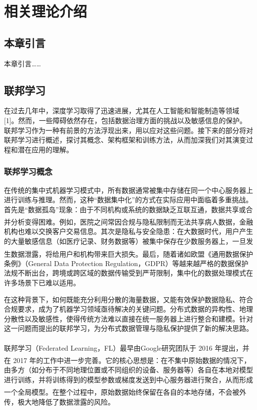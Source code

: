 


\chapter{相关理论介绍}
\thispagestyle{others}
\pagestyle{others}
\xiaosi

\section{本章引言}

本章引言……

\section{联邦学习}
在过去几年中，深度学习取得了迅速进展，尤其在人工智能和智能制造等领域[1]。然而，一些障碍依然存在，包括数据治理方面的挑战以及敏感信息的保护。联邦学习作为一种有前景的方法浮现出来，用以应对这些问题。接下来的部分将对联邦学习进行概述，探讨其概念、架构框架和训练方法，从而加深我们对其演变过程和潜在应用的理解。
\subsection{联邦学习概念}
在传统的集中式机器学习模式中，所有数据通常被集中存储在同一个中心服务器上进行训练与推理。然而，这种“数据集中化”的方式在实际应用中面临着多重挑战。首先是“数据孤岛”现象：由于不同机构或系统的数据缺乏互联互通，数据共享或合并分析变得困难\textsuperscript{\textsuperscript{\cite{yang2019federated}}}。例如，医院之间常因合规与隐私限制而无法共享病人数据，金融机构也难以交换客户交易信息。其次是隐私与安全隐患：在大数据时代，用户产生的大量敏感信息（如医疗记录、财务数据等）被集中保存在少数服务器上，一旦发生数据泄露，将给用户和机构带来巨大损失\textsuperscript{\textsuperscript{\cite{mcmahan2017communication}}}。最后，随着诸如欧盟《通用数据保护条例》（General Data Protection Regulation，GDPR）等越来越严格的数据保护法规不断出台，跨境或跨区域的数据传输受到严苛限制，集中化的数据处理模式在许多场景下已难以适用。

在这种背景下，如何既能充分利用分散的海量数据，又能有效保护数据隐私、符合合规要求，成为了机器学习领域亟待解决的关键问题。分布式数据的异构性、地理分散性以及敏感性，使得传统方法难以直接在统一服务器上进行整合和建模。针对这一问题而提出的联邦学习，为分布式数据管理与隐私保护提供了新的解决思路。

联邦学习（Federated Learning，FL）最早由Google研究团队于 2016 年提出\textsuperscript{\textsuperscript{\cite{konevcny2016federated}}}，并在 2017 年的工作中进一步完善\textsuperscript{\textsuperscript{\cite{mcmahan2017communication}}}。它的核心思想是：在不集中原始数据的情况下，由多方（如分布于不同地理位置或不同组织的设备、服务器等）各自在本地对模型进行训练，并将训练得到的模型参数或梯度发送到中心服务器进行聚合，从而形成一个全局模型\textsuperscript{\textsuperscript{\cite{li2020federated}}}。在整个过程中，原始数据始终保留在各自的本地存储，不会被外传，极大地降低了数据泄露的风险。

